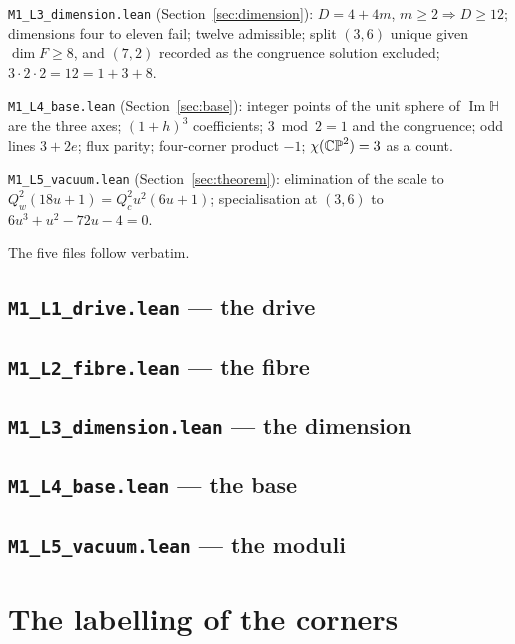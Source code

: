 \documentclass[11pt,a4paper]{article}
\theoremstyle{plain}
\theoremstyle{definition}
\theoremstyle{remark}
\newcommand{\Hquat}{\mathbb{H}}
\newcommand{\ImH}{\operatorname{Im}\Hquat}
\begin{document}
\texttt{M1\_L3\_dimension.lean} (Section~\ref{sec:dimension}): $D=4+4m$, $m\geq2\Rightarrow D\geq12$; dimensions four to eleven fail; twelve admissible; split $(3,6)$ unique given $\dim F\geq8$, and $(7,2)$ recorded as the congruence solution excluded; $3\cdot2\cdot2=12=1+3+8$.

\texttt{M1\_L4\_base.lean} (Section~\ref{sec:base}): integer points of the unit sphere of $\ImH$ are the three axes; $(1+h)^{3}$ coefficients; $3\bmod2=1$ and the congruence; odd lines $3+2e$; flux parity; four-corner product $-1$; $\chi(\mathbb{CP}^2)=3$ as a count.

\texttt{M1\_L5\_vacuum.lean} (Section~\ref{sec:theorem}): elimination of the scale to $Q_{w}^{2}(18u+1)=Q_{c}^{2}u^{2}(6u+1)$; specialisation at $(3,6)$ to $6u^{3}+u^{2}-72u-4=0$.

The five files follow verbatim.

\subsection*{\texttt{M1\_L1\_drive.lean} --- the drive}


\subsection*{\texttt{M1\_L2\_fibre.lean} --- the fibre}


\subsection*{\texttt{M1\_L3\_dimension.lean} --- the dimension}


\subsection*{\texttt{M1\_L4\_base.lean} --- the base}


\subsection*{\texttt{M1\_L5\_vacuum.lean} --- the moduli}


\section{The labelling of the corners}\label{app:labels}
\end{document}
